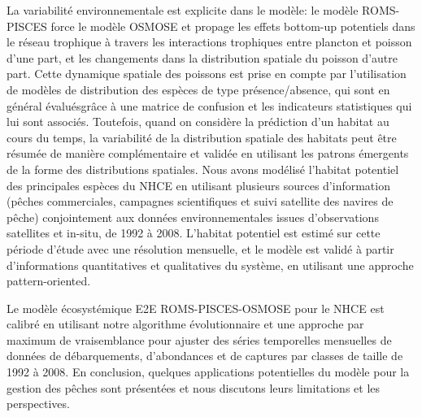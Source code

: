 La variabilité environnementale est explicite dans le modèle: le modèle ROMS-PISCES force le modèle OSMOSE et propage les effets bottom-up potentiels dans le réseau trophique à travers les interactions trophiques entre plancton et poisson d'une part, et les changements dans la distribution spatiale du poisson d'autre part. Cette dynamique spatiale des poissons est prise en compte par l'utilisation de modèles de distribution des espèces de type présence/absence, qui sont en général évaluésgrâce à une matrice de confusion et les indicateurs statistiques qui lui sont associés. Toutefois, quand on considère la prédiction d'un habitat au cours du temps, la variabilité de la distribution spatiale des habitats peut être résumée de manière complémentaire et validée en utilisant les patrons émergents de la forme des distributions spatiales. Nous avons modélisé l'habitat potentiel des principales espèces du NHCE en utilisant plusieurs sources d'information (pêches commerciales, campagnes scientifiques et suivi satellite des navires de pêche) conjointement aux données environnementales issues d'observations satellites et in-situ, de 1992 à 2008. L'habitat potentiel est estimé sur cette période d'étude avec une résolution mensuelle, et le modèle est validé à partir d'informations quantitatives et qualitatives du système, en utilisant une approche pattern-oriented.


Le modèle écosystémique E2E ROMS-PISCES-OSMOSE pour le NHCE est calibré en utilisant notre algorithme évolutionnaire et une approche par maximum de vraisemblance pour ajuster des séries temporelles mensuelles de données de débarquements, d'abondances et de captures par classes de taille de 1992 à 2008. En conclusion, quelques applications potentielles du modèle pour la gestion des pêches sont présentées et nous discutons leurs limitations et les perspectives. 
